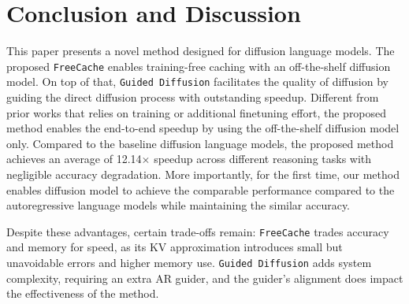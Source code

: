 \section{Conclusion and Discussion}
This paper presents a novel method designed for diffusion language models. The proposed \texttt{FreeCache} enables training-free caching with an off-the-shelf diffusion model. On top of that, \texttt{Guided Diffusion} facilitates the quality of diffusion by guiding the direct diffusion process with outstanding speedup. 
Different from prior works that relies on training or additional finetuning effort, the proposed method enables the end-to-end speedup by using the off-the-shelf diffusion model only. Compared to the baseline diffusion language models, the proposed method achieves an average of 12.14$\times$ speedup across different reasoning tasks with negligible accuracy degradation. More importantly, for the first time, our method enables diffusion model to achieve the comparable performance compared to the autoregressive language models while maintaining the similar accuracy. 

Despite these advantages, certain trade-offs remain: \texttt{FreeCache} trades accuracy and memory for speed, as its KV approximation introduces small but unavoidable errors and higher memory use. \texttt{Guided Diffusion} adds system complexity, requiring an extra AR guider, and the guider’s alignment does impact the effectiveness of the method.




